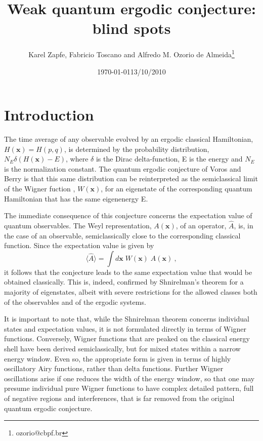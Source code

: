 \documentclass[12pt]{iopart}
\newcommand{\x}{{\mathbf x}}
\newcommand{\opA}{{\hat{A}}}
\begin{document}
\title{Weak quantum ergodic conjecture: blind spots}
\author {Karel Zapfe, Fabricio Toscano and Alfredo M. Ozorio de Almeida\footnote{ozorio@cbpf.br}}
\address{Centro Brasileiro de Pesquisas Fisicas,
Rua Xavier Sigaud 150, 22290-180, Rio de Janeiro, R.J., Brazil}
\date{\today}
\date{13/10/2010}
\begin{abstract}

\end{abstract}



\maketitle
\section{Introduction}

The time average of any observable evolved by an ergodic classical Hamiltonian,
$H(\x)= H(p,q)$, is determined by the probability distribution, $N_E \delta(H(\x)-E)$,
where $\delta$ is the Dirac delta-function, E is the energy and $N_E$ 
is the normalization constant. The quantum ergodic conjecture of Voros \cite{Voros76} and Berry \cite{Berry77b}
is that this same distribution can be reinterpreted as the semiclassical limit 
of the Wigner fuction \cite{Wigner}, $W(\x)$, for an eigenstate of the corresponding quantum Hamiltonian 
that has the same eigenenergy E. 

The immediate consequence of this conjecture concerns the expectation value of quantum observables.
The Weyl representation, $A(\x)$, of an operator, $\opA$, is,
in the case of an observable, semiclassically close to the corresponding classical function.
Since the expectation value is given by
\begin{equation}
\langle \opA \rangle = \int d\x \;W(\x)\;A(\x) \ ,
\label{expectation}
\end{equation}
it follows that the conjecture leads to the same expectation value that would be obtained classically.
This is, indeed, confirmed by Shnirelman's theorem \cite{Shnirelman, Verdiere, Zelditch} for a majority of eigenstates, 
albeit with severe restrictions for the allowed classes both of the observables and of the ergodic systems.

It is important to note that, while the Shnirelman theorem concerns individual states 
and expectation values, it is not formulated directly in terms of Wigner functions.
Conversely, Wigner functions that are peaked on the classical energy shell
have been derived semiclassically, but for mixed states within a narrow energy window.
Even so, the appropriate form is given in terms of highly oscillatory Airy functions, 
rather than delta functions.
Further Wigner oscillations arise if one reduces the width of the energy window, 
so that one may presume individual pure Wigner functions to have complex detailed pattern,
full of negative regions and interferences, that is far removed from the original quantum ergodic conjecture.
\end{document}
